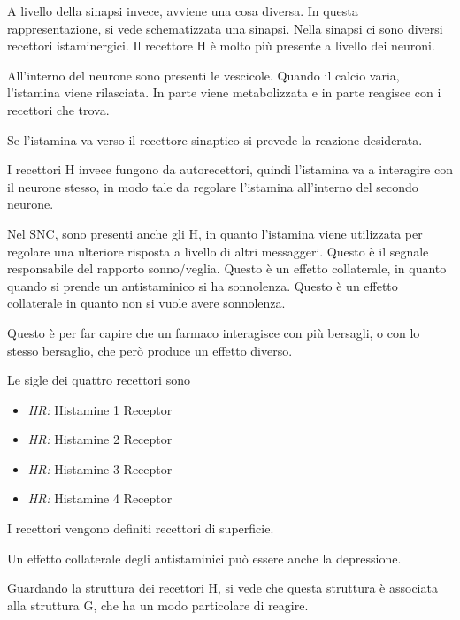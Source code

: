 A livello della sinapsi invece, avviene una cosa diversa.
In questa rappresentazione, si vede schematizzata una sinapsi. Nella
sinapsi ci sono diversi recettori istaminergici.
Il recettore H è molto più presente a livello dei neuroni.


All'interno del neurone sono presenti le vescicole. Quando il calcio
varia, l'istamina viene rilasciata. In parte viene metabolizzata e in
parte reagisce con i recettori che trova.

Se l'istamina va verso il recettore sinaptico si prevede la reazione
desiderata.

I recettori H invece fungono da autorecettori, quindi l'istamina va a
interagire con il neurone stesso, in modo tale da regolare l'istamina
all'interno del secondo neurone.

Nel SNC, sono presenti anche gli H, in quanto l'istamina viene
utilizzata per regolare una ulteriore risposta a livello di altri
messaggeri. Questo è il segnale responsabile del rapporto sonno/veglia.
Questo è un effetto collaterale, in quanto quando si prende un
antistaminico si ha sonnolenza. Questo è un effetto collaterale in
quanto non si vuole avere sonnolenza.

Questo è per far capire che un farmaco interagisce con più bersagli, o
con lo stesso bersaglio, che però produce un effetto diverso.

Le sigle dei quattro recettori sono
\begin{itemize}
  \item \emph{HR:} Histamine 1 Receptor
  \item \emph{HR:} Histamine 2 Receptor
  \item \emph{HR:} Histamine 3 Receptor
  \item \emph{HR:} Histamine 4 Receptor
\end{itemize}


I recettori vengono definiti recettori di superficie.

Un effetto collaterale degli antistaminici può essere anche la
depressione.

Guardando la struttura dei recettori H, si vede che questa struttura è
associata alla struttura G, che ha un modo particolare di reagire.

